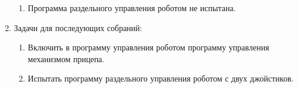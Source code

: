 \begin{enumerate}
\begin{enumerate}
		\item Программа раздельного управления роботом не испытана.
		
	\end{enumerate}
	
	\item Задачи для последующих собраний:
	\begin{enumerate}
		\item Включить в программу управления роботом программу управления механизмом прицепа.
		
		\item Испытать программу раздельного управления роботом с двух джойстиков.
		
	\end{enumerate}     
\end{enumerate}

\fillpage

